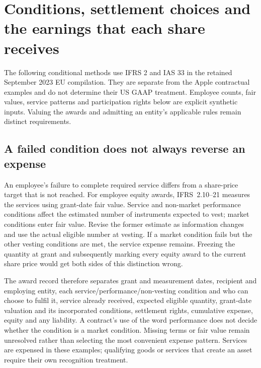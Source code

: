 \hypertarget{conditions-settlement-choices-and-the-earnings-that-each-share-receives}{%
\section{Conditions, settlement choices and the earnings that each share receives}\label{conditions-settlement-choices-and-the-earnings-that-each-share-receives}}

The following conditional methods use IFRS 2 and IAS 33 in the retained September 2023 EU compilation. They are separate from the Apple contractual examples and do not determine their US GAAP treatment. Employee counts, fair values, service patterns and participation rights below are explicit synthetic inputs. Valuing the awards and admitting an entity's applicable rules remain distinct requirements.

\hypertarget{a-failed-condition-does-not-always-reverse-an-expense}{%
\subsection{A failed condition does not always reverse an expense}\label{a-failed-condition-does-not-always-reverse-an-expense}}

An employee's failure to complete required service differs from a share-price target that is not reached. For employee equity awards, IFRS~2.10--21 \citep[IFRS~2.10--23]{eu20231803} measures the services using grant-date fair value. Service and non-market performance conditions affect the estimated number of instruments expected to vest; market conditions enter fair value. Revise the former estimate as information changes and use the actual eligible number at vesting. If a market condition fails but the other vesting conditions are met, the service expense remains. Freezing the quantity at grant and subsequently marking every equity award to the current share price would get both sides of this distinction wrong.

The award record therefore separates grant and measurement dates, recipient and employing entity, each service/performance/non-vesting condition and who can choose to fulfil it, service already received, expected eligible quantity, grant-date valuation and its incorporated conditions, settlement rights, cumulative expense, equity and any liability. A contract's use of the word performance does not decide whether the condition is a market condition. Missing terms or fair value remain unresolved rather than selecting the most convenient expense pattern. Services are expensed in these examples; qualifying goods or services that create an asset require their own recognition treatment.

